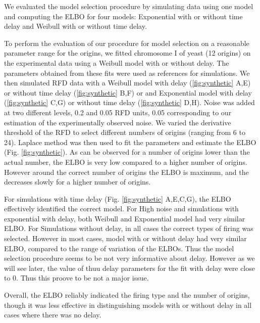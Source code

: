 \documentclass[10pt,a4paper]{revtex4-2}
\begin{document}
We evaluated the model selection procedure by simulating data using one model and computing the ELBO for four models: Exponential with or without time delay and Weibull with or without time delay.

To perform the evaluation of our procedure for model selection on a reasonable parameter range for the origins, 
we fitted chromosome I of yeast (12 origins) on the experimental data using a Weibull model with or without delay.
The parameters obtained from these fits were used as references for simulations. 
We then simulated RFD data with a Weibull model with delay (\ref{fig:synthetic} A,E) or without time delay (\ref{fig:synthetic} B,F) 
or and Exponential model with delay (\ref{fig:synthetic} C,G) or without time delay (\ref{fig:synthetic} D,H).  
Noise was added at two different levels, 0.2 and 0.05 RFD units, 0.05 corresponding to our estimation of the experimentally
observed noise. 
We varied the derivative threshold of the RFD to select different numbers of origins (ranging from 6 to 24). 
Laplace method was then used to fit the parameters and estimate the ELBO (Fig. \ref{fig:synthetic}).
 As can be observed for a number of origins lower than the actual number,
  the ELBO is very low compared to a higher number of origins. 
  However around the correct number of origins the ELBO is maximum,
  and the decreases slowly for a higher number of origins.

For simulations with time delay (Fig. \ref{fig:synthetic} A,E,C,G), the ELBO effectively identified the correct model. 
For High noise and simulations with exponential with delay, both Weibull and Exponential model had very similar ELBO.
For Simulations without delay, in all cases the correct types of firing was selected. 
However in most cases,  model with or without delay had very similar ELBO, compared to the range of variation of the ELBOs.
Thus the model selection procedure seems to be not very informative about delay. 
However as we will see later, the value of thuu delay parameters for the fit with delay were close to 0. 
Thus this proove to be not a major issue.

Overall, the ELBO reliably indicated the firing type and the number of origins, 
though it was less effective in distinguishing models with or without delay in all cases where there was no delay.
\end{document}
